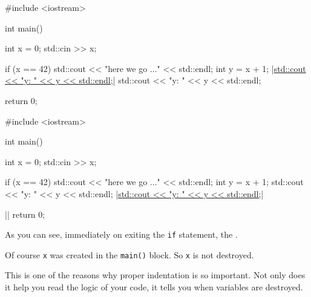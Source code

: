 \begin{consolethree}[escapeinside=||]
#include <iostream>

int main()
{    
     int x = 0;
     std::cin >> x;
     
     if (x == 42)
     {   
         std::cout << "here we go ..." << std::endl;
         int y = x + 1;
         |\underline{std::cout << "y: " << y << std::endl;}|
     }
     std::cout << "y: " << y << std::endl;

     return 0;
}
\end{consolethree}



\begin{consolethree}[escapeinside=||]
#include <iostream>

int main()
{    
     int x = 0;
     std::cin >> x;

     if (x == 42)
     {   
         std::cout << "here we go ..." <<
         std::endl;
         int y = x + 1;
         std::cout << "y: " << y << std::endl;
     }
     |\underline{std::cout << "y: " << y << std::endl;}|
     
     ||        
     return 0;
}
\end{consolethree}
As you can see, immediately on exiting the \texttt{if} statement, the \texttt{}.

Of course \texttt{x} was created in the \texttt{main()} block. So \texttt{x} is not destroyed.

This is one of the reasons why proper indentation is so important. Not only does it help you read the logic of your code, it tells you when variables are destroyed.

\newpage{}

